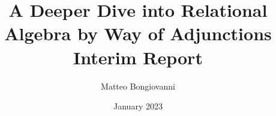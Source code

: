 \documentclass{article}
\title{A Deeper Dive into Relational Algebra by Way of Adjunctions Interim Report}
\author{Matteo Bongiovanni}
\date{January 2023}
\begin{document}
\maketitle

\begin{comment}
The aim of the project interim report is multi-fold:

  1. To provide a document that your second marker can use as a basis for discussion on your project plan and progress to date.
  2. To show that you have considered the ethical implications of your project.
  3. To provide a substantial body of text, primarily the project background and related work, that you can use in your final report. 

By the time the interim report is due you should have a clearly defined project, understand well the motivation and issues to be addressed, know the background work in detail, have the main ideas for how to tackle the problem and have started the development. You should also have a plan for the remainder of the project and, importantly, how to evaluate the project.

The interim report should contain the following sections. An approximate page count is suggested for each section, but there are no hard limits either way:


You are free to write up any additional material that will appear in the final report, for example a section or chapter describing a significant component of the design/implementation that you have already completed.  Avoid any additional material that is not re-usable in the final report.

As always, use diagrams and examples (e.g. code) wherever appropriate.

If you need inspiration, take a look at the Distinguished Projects from previous years, focusing in particular at this stage on the introduction, background and evaluation sections.
\end{comment}
\end{document}
